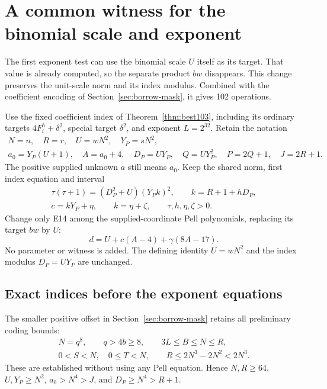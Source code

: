 \section{A common witness for the binomial scale and exponent}
\label{sec:common-witness}

The first exponent test can use the binomial scale $U$ itself as its
target. That value is already computed, so the separate product $bw$
disappears. This change preserves the unit-scale norm and its index
modulus. Combined with the coefficient encoding of
Section~\ref{sec:borrow-mask}, it gives 102 operations.

Use the fixed coefficient index of Theorem~\ref{thm:best103}, including
its ordinary targets $4F_i^h+\delta^2$, special target $\delta^2$,
and exponent $L=2^{32}$. Retain the notation
\[
\begin{gathered}
 N=n,\quad R=r,\quad U=wN^2,\quad Y_P=sN^2,\\
 a_0=Y_P(U+1),\quad A=a_0+4,\quad
 D_P=UY_P,\quad Q=UY_P^2,\quad P=2Q+1,\quad J=2R+1.
\end{gathered}
\]
The positive supplied unknown $a$ still means $a_0$.
Keep the shared norm, first index equation and interval
\begin{equation}\label{eq:common-witness-pell}
\begin{gathered}
 \tau(\tau+1)=(D_P^2+U)(Y_Pk)^2,\qquad
 k=R+1+hD_P,\\
 c=kY_P+\eta,\qquad k=\eta+\zeta,
 \qquad\tau,h,\eta,\zeta>0.
\end{gathered}
\end{equation}
Change only E14 among the supplied-coordinate Pell polynomials,
replacing its target $bw$ by $U$:
\begin{equation}\label{eq:common-witness-exponent}
 d=U+c(A-4)+\gamma(8A-17).
\end{equation}
No parameter or witness is added. The defining identity $U=wN^2$
and the index modulus $D_P=UY_P$ are unchanged.

\subsection{Exact indices before the exponent equations}

The smaller positive offset in Section~\ref{sec:borrow-mask} retains
all preliminary coding bounds:
\[
\begin{gathered}
 N=q^8,\qquad q>4b\ge8,\qquad 3L\le B\le N\le R,\\
 0<S<N,\quad0\le T<N,\qquad
 R\le2N^3-2N^2<2N^3.
\end{gathered}
\]
These are established without using any Pell equation. Hence
$N,R\ge64$, $U,Y_P\ge N^2$, $a_0>N^4>J$, and
$D_P\ge N^4>R+1$.

